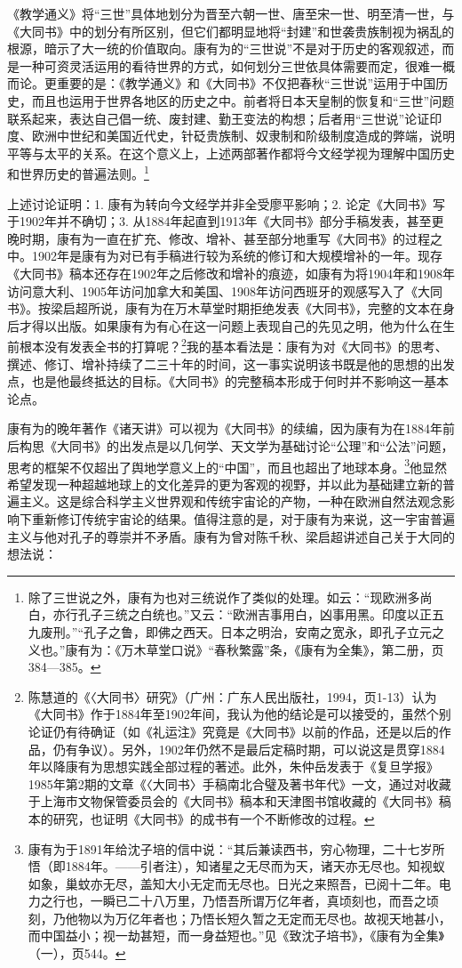 \documentclass[a4paper, 12pt, openright]{ctexbook}
\begin{document}
《教学通义》将“三世”具体地划分为晋至六朝一世、唐至宋一世、明至清一世，与《大同书》中的划分有所区别，但它们都明显地将“封建”和世袭贵族制视为祸乱的根源，暗示了大一统的价值取向。康有为的“三世说”不是对于历史的客观叙述，而是一种可资灵活运用的看待世界的方式，如何划分三世依具体需要而定，很难一概而论。更重要的是：《教学通义》和《大同书》不仅把春秋“三世说”运用于中国历史，而且也运用于世界各地区的历史之中。前者将日本天皇制的恢复和“三世”问题联系起来，表达自己倡一统、废封建、勤王变法的构想；后者用“三世说”论证印度、欧洲中世纪和美国近代史，针砭贵族制、奴隶制和阶级制度造成的弊端，说明平等与太平的关系。在这个意义上，上述两部著作都将今文经学视为理解中国历史和世界历史的普遍法则。\footnote{除了三世说之外，康有为也对三统说作了类似的处理。如云：“现欧洲多尚白，亦行孔子三统之白统也。”又云：“欧洲吉事用白，凶事用黑。印度以正五九废刑。”“孔子之鲁，即佛之西天。日本之明治，安南之宽永，即孔子立元之义也。”康有为：《万木草堂口说》“春秋繁露”条，《康有为全集》，第二册，页384—385。}

上述讨论证明：1. 康有为转向今文经学并非全受廖平影响；2. 论定《大同书》写于1902年并不确切；3. 从1884年起直到1913年《大同书》部分手稿发表，甚至更晚时期，康有为一直在扩充、修改、增补、甚至部分地重写《大同书》的过程之中。1902年是康有为对已有手稿进行较为系统的修订和大规模增补的一年。现存《大同书》稿本还存在1902年之后修改和增补的痕迹，如康有为将1904年和1908年访问意大利、1905年访问加拿大和美国、1908年访问西班牙的观感写入了《大同书》。按梁启超所说，康有为在万木草堂时期拒绝发表《大同书》，完整的文本在身后才得以出版。如果康有为有心在这一问题上表现自己的先见之明，他为什么在生前根本没有发表全书的打算呢？\footnote{陈慧道的《〈大同书〉研究》（广州：广东人民出版社，1994，页1-13）认为《大同书》作于1884年至1902年间，我认为他的结论是可以接受的，虽然个别论证仍有待确证（如《礼运注》究竟是《大同书》以前的作品，还是以后的作品，仍有争议）。另外，1902年仍然不是最后定稿时期，可以说这是贯穿1884年以降康有为思想实践全部过程的著述。此外，朱仲岳发表于《复旦学报》1985年第2期的文章《〈大同书〉手稿南北合璧及著书年代》一文，通过对收藏于上海市文物保管委员会的《大同书》稿本和天津图书馆收藏的《大同书》稿本的研究，也证明《大同书》的成书有一个不断修改的过程。}我的基本看法是：康有为对《大同书》的思考、撰述、修订、增补持续了二三十年的时间，这一事实说明该书既是他的思想的出发点，也是他最终抵达的目标。《大同书》的完整稿本形成于何时并不影响这一基本论点。

康有为的晚年著作《诸天讲》可以视为《大同书》的续编，因为康有为在1884年前后构思《大同书》的出发点是以几何学、天文学为基础讨论“公理”和“公法”问题，思考的框架不仅超出了舆地学意义上的“中国”，而且也超出了地球本身。\footnote{康有为于1891年给沈子培的信中说：“其后兼读西书，穷心物理，二十七岁所悟（即1884年。——引者注），知诸星之无尽而为天，诸天亦无尽也。知视蚁如象，巢蚊亦无尽，盖知大小无定而无尽也。日光之来照吾，已阅十二年。电力之行也，一瞬已二十八万里，乃悟吾所谓万亿年者，真顷刻也，而吾之顷刻，乃他物以为万亿年者也；乃悟长短久暂之无定而无尽也。故视天地甚小，而中国益小；视一劫甚短，而一身益短也。”见《致沈子培书》，《康有为全集》（一），页544。}他显然希望发现一种超越地球上的文化差异的更为客观的视野，并以此为基础建立新的普遍主义。这是综合科学主义世界观和传统宇宙论的产物，一种在欧洲自然法观念影响下重新修订传统宇宙论的结果。值得注意的是，对于康有为来说，这一宇宙普遍主义与他对孔子的尊崇并不矛盾。康有为曾对陈千秋、梁启超讲述自己关于大同的想法说：
\end{document}
